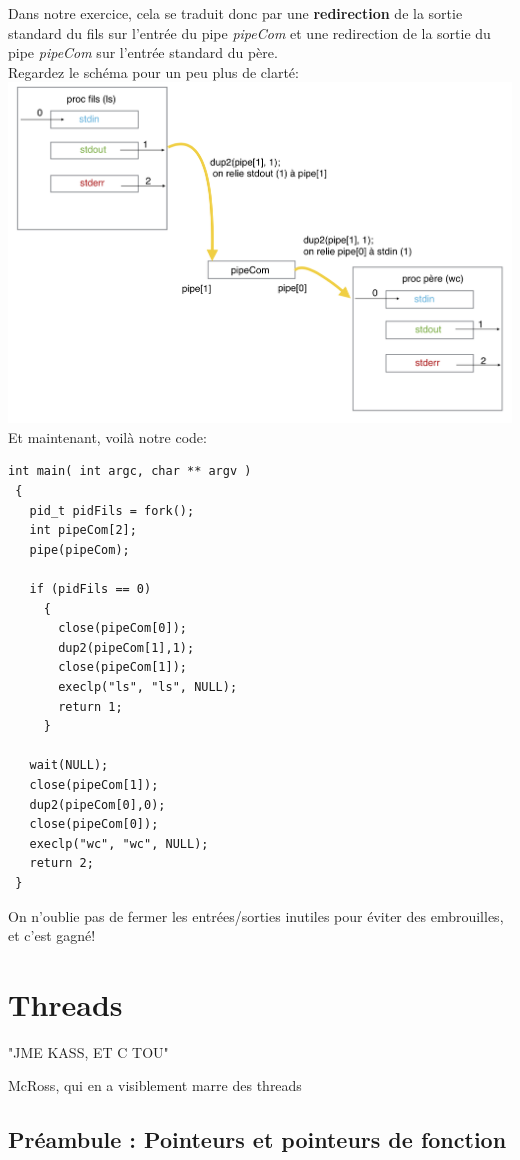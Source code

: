 \documentclass{report}
\begin{document}
Dans notre exercice, cela se traduit donc par une \textbf{redirection} de la sortie standard du fils sur l'entrée du pipe \emph{pipeCom} et une redirection de la sortie du pipe \emph{pipeCom} sur l'entrée standard du père.\\ Regardez le schéma pour un peu plus de clarté:\\
\includegraphics[scale=0.5]{dup2}
\\ Et maintenant, voilà notre code:
\begin{lstlisting}
int main( int argc, char ** argv )
 {
   pid_t pidFils = fork();
   int pipeCom[2];
   pipe(pipeCom);

   if (pidFils == 0)
     {
       close(pipeCom[0]);
       dup2(pipeCom[1],1);
       close(pipeCom[1]);
       execlp("ls", "ls", NULL);
       return 1;
     }

   wait(NULL);
   close(pipeCom[1]);
   dup2(pipeCom[0],0);
   close(pipeCom[0]);
   execlp("wc", "wc", NULL);
   return 2;
 }
\end{lstlisting}
On n'oublie pas de fermer les entrées/sorties inutiles pour éviter des embrouilles, et c'est gagné!




\chapter{Threads}
\epigraph{"JME KASS, ET C TOU"}{McRoss, qui en a visiblement marre des threads}

\section{Préambule : Pointeurs et pointeurs de fonction}
\end{document}
